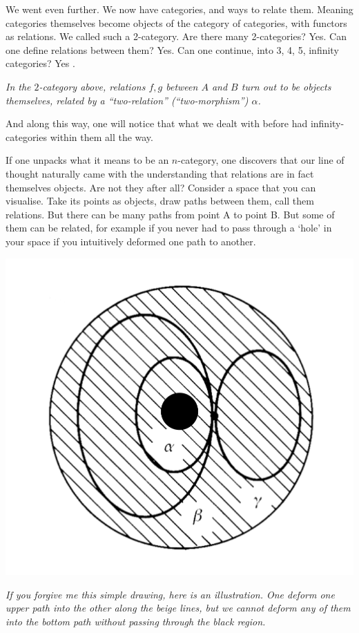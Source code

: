 \documentclass{article}
\begin{document}
We went even further. We now have categories, and ways to relate them. Meaning categories themselves become objects of the category of categories, with functors as relations. We called such a 2-category. Are there many 2-categories? Yes. Can one define relations between them? Yes. Can one continue, into 3, 4, 5, infinity categories? Yes \cite{BAEZ, NLABINFTY}.

\begin{center}

\smallskip

\textit{In the $2$-category above, relations $f,g$ between $A$ and $B$ turn out to be objects themselves, related by a ``two-relation'' (``two-morphism'') $\alpha$.}
\end{center}


And along this way, one will notice that what we dealt with before had infinity-categories within them all the way.

If one unpacks what it means to be an $n$-category, one discovers that our line of thought naturally came with the understanding that relations are in fact themselves objects. Are not they after all? Consider a space that you can visualise. Take its points as objects, draw paths between them, call them relations. But there can be many paths from point A to point B. But some of them can be related, for example if you never had to pass through a ‘hole’ in your space if you intuitively deformed one path to another.

\begin{center}
\includegraphics[scale=0.11]{paths}

\textit{If you forgive me this simple drawing, here is an illustration. One deform one upper path into the other along the beige lines, but we cannot deform any of them into the bottom path without passing through the black region.}
\end{center}
\end{document}
